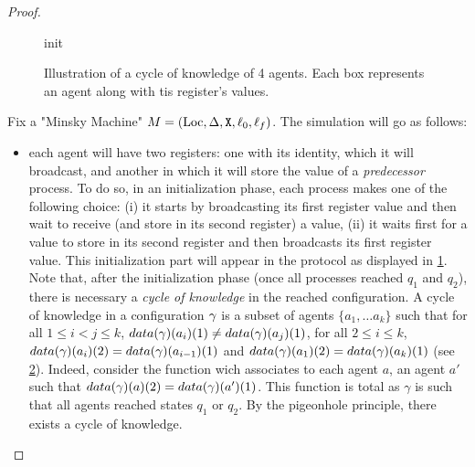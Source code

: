 \begin{proof}
	

\begin{figure}
	
	\caption{init}\label{fig:target-init}
\end{figure}





	\begin{figure}
	
	\caption{Illustration of a cycle of knowledge of 4 agents. Each box represents an agent along with tis register's values.}\label{fig:target-cycle-knowledge}
\end{figure}
	
	Fix a "Minsky Machine" $M= (\text{Loc}, \Delta, \mathtt{X}, \ell_0, \ell_f)$. The simulation will go as follows: 
	\begin{itemize}
		\item each agent will have two registers: one with its identity, which it will broadcast, and another in which it will store the value of a \emph{predecessor} process. To do so, in an initialization phase, each process makes one of the following choice: (i) it starts by broadcasting its first register value and then wait to receive (and store in its second register) a value, (ii) it waits first for a value to store in its second register and then broadcasts its first register value. This initialization part will appear in the protocol as displayed in \cref{fig:target-init}. Note that, after the initialization phase (once all processes reached $q_1$ and $q_2$), there is necessary a \emph{cycle of knowledge} in the reached configuration. A cycle of knowledge in a configuration $\gamma$ is a subset of agents $\{a_1, \dots a_k\}$ such that for all $1 \leq i < j \leq k$, $\data{\config}(a_i)(1) \ne \data{\config}(a_j)(1)$, for all $2 \leq i \leq k$, $\data{\config}(a_i)(2) = \data{\config}(a_{i-1})(1)$ and $\data{\config}(a_1)(2) = \data{\config}(a_{k})(1)$ (see \cref{fig:target-cycle-knowledge}). Indeed, consider the function wich associates to each agent $a$, an agent $a'$ such that $\data{\config}(a)(2) = \data{\config}(a')(1)$. This function is total as $\gamma$ is such that all agents reached states $q_1$ or $q_2$. By the pigeonhole principle, there exists a cycle of knowledge.
		

\end{itemize}
\end{proof}
